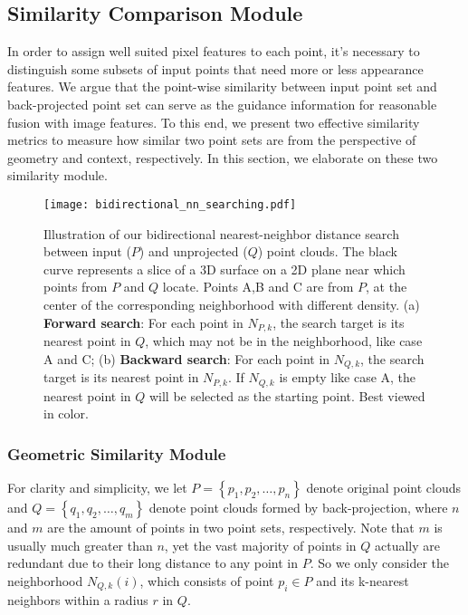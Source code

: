 \documentclass[letterpaper, 10 pt, conference]{ieeeconf}
\begin{document}
\subsection{Similarity Comparison Module}

In order to assign well suited pixel features to each point, it's necessary to distinguish some subsets of input points that need more or less appearance features. We argue that the point-wise similarity between input point set and back-projected point set can serve as the guidance information for reasonable fusion with image features. To this end, we present two effective similarity metrics to measure how similar two point sets are from the perspective of geometry and context, respectively. In this section, we elaborate on these two similarity module.

\begin{figure}[t]
\texttt{[image: bidirectional\_nn\_searching.pdf]}
\vspace{-7mm}
\caption{Illustration of our bidirectional nearest-neighbor distance search between input ($P$) and unprojected ($Q$) point clouds. 
The black curve represents a slice of a 3D surface on a 2D plane near which points from $P$ and $Q$ locate. Points A,B and C are from $P$, at the center of the corresponding neighborhood with different density. 
(a) \textbf{Forward search}: For each point in $N_{P,k}$, the search target is its nearest point in $Q$, which may not be in the neighborhood, like case A and C; (b) \textbf{Backward search}: For each point in $N_{Q,k}$, the search target is its nearest point in $N_{P,k}$. If $N_{Q,k}$ is empty like case A, the nearest point in $Q$ will be selected as the starting point.
Best viewed in color.} 
\vspace{-7mm}
\end{figure}

\subsubsection{\textbf{Geometric Similarity Module}}

For clarity and simplicity, we let $P = \left\{p_{1},p_{2},\ldots ,p_{n} \right\}$ denote original point clouds and $Q = \left\{q_{1},q_{2},\ldots ,q_{m} \right\}$ denote point clouds formed by back-projection, where $n$ and $m$ are the amount of points in two point sets, respectively. Note that $m$ is usually much greater than $n$, yet the vast majority of points in $Q$ actually are redundant due to their long distance to any point in $P$. So we only consider the neighborhood $N_{Q,k}(i)$, which consists of point $p_{i} \in P$ and its k-nearest neighbors within a radius $r$ in $Q$.
\end{document}
